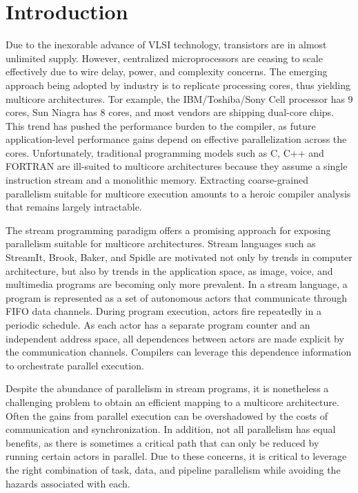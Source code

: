 \section{Introduction}


Due to the inexorable advance of VLSI technology, transistors are in
almost unlimited supply.  However, centralized microprocessors are
ceasing to scale effectively due to wire delay, power, and complexity
concerns.  The emerging approach being adopted by industry is to
replicate processing cores, thus yielding multicore architectures.
Tor example, the IBM/Toshiba/Sony Cell processor has 9 cores\cite{},
Sun Niagra has 8 cores\cite{}, and most vendors are shipping dual-core
chips.  This trend has pushed the performance burden to the compiler,
as future application-level performance gains depend on effective
parallelization across the cores.  Unfortunately, traditional
programming models such as C, C++ and FORTRAN are ill-suited to
multicore architectures because they assume a single instruction
stream and a monolithic memory.  Extracting coarse-grained parallelism
suitable for multicore execution amounts to a heroic compiler analysis
that remains largely intractable.

The stream programming paradigm offers a promising approach for
exposing parallelism suitable for multicore architectures.  Stream
languages such as StreamIt\cite{}, Brook\cite{}, Baker\cite{}, and
Spidle\cite{} are motivated not only by trends in computer
architecture, but also by trends in the application space, as image,
voice, and multimedia programs are becoming only more prevalent.  In a
stream language, a program is represented as a set of autonomous
actors that communicate through FIFO data channels.  During program
execution, actors fire repeatedly in a periodic schedule.  As each
actor has a separate program counter and an independent address space,
all dependences between actors are made explicit by the communication
channels.  Compilers can leverage this dependence information to
orchestrate parallel execution.

Despite the abundance of parallelism in stream programs, it is
nonetheless a challenging problem to obtain an efficient mapping to a
multicore architecture.  Often the gains from parallel execution can
be overshadowed by the costs of communication and synchronization.  In
addition, not all parallelism has equal benefits, as there is
sometimes a critical path that can only be reduced by running certain
actors in parallel.  Due to these concerns, it is critical to leverage
the right combination of task, data, and pipeline parallelism while
avoiding the hazards associated with each.

